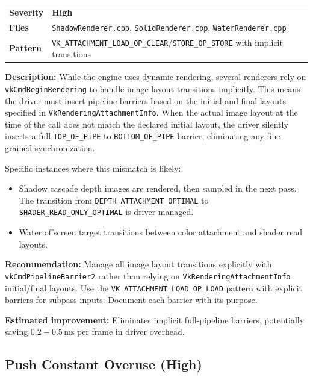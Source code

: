 \documentclass[a4paper,10pt]{article}
\newcommand{\ms}{\ensuremath{\,\text{ms}}}
\newcommand{\severity}[1]{%
  \ifstrequal{#1}{Critical}{\textcolor{critical}{\textbf{#1}}}{%
  \ifstrequal{#1}{High}{\textcolor{high}{\textbf{#1}}}{%
  \ifstrequal{#1}{Medium}{\textcolor{medium}{\textbf{#1}}}{%
  \ifstrequal{#1}{Low}{\textcolor{low}{\textbf{#1}}}{#1}}}}}
\begin{document}
\begin{tabular}{ll}
\textbf{Severity} & \severity{High} \\
\textbf{Files}     & \texttt{ShadowRenderer.cpp}, \texttt{SolidRenderer.cpp},
                      \texttt{WaterRenderer.cpp} \\
\textbf{Pattern}   & \texttt{VK\_ATTACHMENT\_LOAD\_OP\_CLEAR}/\texttt{STORE\_OP\_STORE}
                      with implicit transitions \\
\end{tabular}

\vspace{0.5em}
\noindent
\textbf{Description:} While the engine uses dynamic rendering, several renderers
rely on \texttt{vkCmdBeginRendering} to handle image layout transitions
implicitly. This means the driver must insert pipeline barriers based on the
initial and final layouts specified in \texttt{VkRenderingAttachmentInfo}.
When the actual image layout at the time of the call does not match the
declared initial layout, the driver silently inserts a full
\texttt{TOP\_OF\_PIPE} to \texttt{BOTTOM\_OF\_PIPE} barrier, eliminating any
fine-grained synchronization.

Specific instances where this mismatch is likely:
\begin{itemize}[nosep]
    \item Shadow cascade depth images are rendered, then sampled in the next
          pass. The transition from \texttt{DEPTH\_ATTACHMENT\_OPTIMAL} to
          \texttt{SHADER\_READ\_ONLY\_OPTIMAL} is driver-managed.
    \item Water offscreen target transitions between color attachment and
          shader read layouts.
\end{itemize}

\noindent\textbf{Recommendation:} Manage all image layout transitions explicitly
with \texttt{vkCmdPipelineBarrier2} rather than relying on
\texttt{VkRenderingAttachmentInfo} initial/final layouts. Use the
\texttt{VK\_ATTACHMENT\_LOAD\_OP\_LOAD} pattern with explicit barriers for
subpass inputs. Document each barrier with its purpose.

\noindent\textbf{Estimated improvement:} Eliminates implicit full-pipeline
barriers, potentially saving $0.2{-}0.5\ms$ per frame in driver overhead.

\subsection{Push Constant Overuse (High)}
\end{document}
